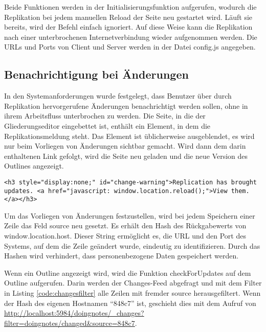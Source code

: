 Beide Funktionen werden in der Initialisierungsfunktion aufgerufen, wodurch die Replikation bei jedem manuellen Reload der Seite neu gestartet wird. Läuft sie bereits, wird der Befehl einfach ignoriert. Auf diese Weise kann die Replikation nach einer unterbrochenen Internetverbindung wieder aufgenommen werden. Die URLs und Ports von Client und Server werden in der Datei {\selectfont config.js} angegeben.


\subsection{Benachrichtigung bei Änderungen}
\label{subsec:nochanges}


In den Systemanforderungen wurde festgelegt, dass Benutzer über durch Replikation hervorgerufene Änderungen benachrichtigt werden sollen, ohne in ihrem Arbeitsfluss unterbrochen zu werden. Die Seite, in die der Gliederungseditor eingebettet ist, enthält ein Element, in dem die Replikationsmeldung steht. Das Element ist üblicherweise ausgeblendet, es wird nur beim Vorliegen von Änderungen sichtbar gemacht. Wird dann dem darin enthaltenen Link gefolgt, wird die Seite neu geladen und die neue Version des Outlines angezeigt.

\lstset{language=html}
\medskip 
\begin{lstlisting}[caption=Benachrichtigung über Änderungen]
<h3 style="display:none;" id="change-warning">Replication has brought updates. <a href="javascript: window.location.reload();">View them.</a></h3>
\end{lstlisting}

Um das Vorliegen von Änderungen festzustellen, wird bei jedem Speichern einer Zeile das Feld {\selectfont source} neu gesetzt. Es erhält den Hash des Rückgabewerts von {\selectfont window.location.host}. Dieser String ermöglicht es, die URL und den Port des Systems, auf dem die Zeile geändert wurde, eindeutig zu identifizieren. Durch das Hashen wird verhindert, dass personenbezogene Daten gespeichert werden. 

Wenn ein Outline angezeigt wird, wird die Funktion {\selectfont checkForUpdates} auf dem Outline aufgerufen. Darin werden der Changes-Feed abgefragt und mit dem Filter in Listing \ref{code:changesfilter} alle Zeilen mit fremder {\selectfont source} herausgefiltert. Wenn der Hash des eigenen Hostnamen \enquote{848c7} ist, geschieht dies mit dem Aufruf von \url{http://localhost:5984/doingnotes/\_changes?filter=doingnotes/changed&source=848c7}.

